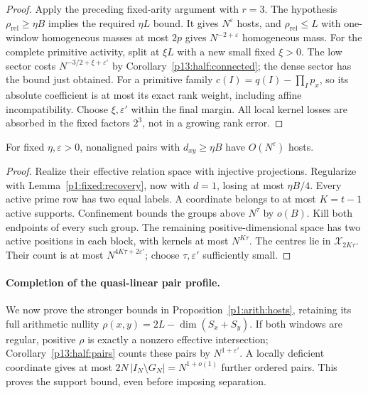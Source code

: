 \begin{proof}
Apply the preceding fixed-arity argument with $r=3$. The hypothesis
$\rho_{\mathrm{rel}}\ge\eta B$ implies the required $\eta L$ bound.
It gives $N^\varepsilon$ hosts, and $\rho_{\mathrm{rel}}\le L$ with
one-window homogeneous masses at most $2p$ gives
$N^{-2+\varepsilon}$ homogeneous mass.
For the complete primitive activity, split at $\xi L$ with a new
small fixed $\xi>0$. The low sector costs
$N^{-3/2+\xi+\varepsilon'}$ by
Corollary~\ref{p13:half:connected}; the dense sector has the bound
just obtained. For a primitive family $c(I)=q(I)-\prod_Ip_x$, so its
absolute coefficient is at most its exact rank weight, including
affine incompatibility. Choose $\xi,\varepsilon'$ within the final
margin. All local kernel losses are absorbed in the fixed factors
$2^3$, not in a growing rank error.
\end{proof}

\begin{corollary}
\label{p13:conf:dense-pairs}
For fixed \(\eta,\varepsilon>0\), nonaligned pairs
with \(d_{xy}\ge\eta B\) have \(O(N^\varepsilon)\)
hosts.
\end{corollary}

\begin{proof}
Realize their effective relation space with injective
projections. Regularize with
Lemma~\ref{p1:fixed:recovery}, now with \(d=1\),
losing at most \(\eta B/4\).
Every active prime row has two equal labels.
A coordinate belongs to at most \(K=t-1\) active supports.
Confinement bounds the groups above \(N^\tau\) by \(o(B)\).
Kill both endpoints of every such group.
The remaining positive-dimensional space has two active
positions in each block, with kernels at most \(N^{K\tau}\).
The centres lie in \(\mathcal X_{2K\tau}\).
Their count is at most \(N^{4K\tau+2\varepsilon'}\);
choose \(\tau,\varepsilon'\) sufficiently small.
\end{proof}


\paragraph{Completion of the quasi-linear pair profile.}
\label{p18:conf:pair-profile}
We now prove the stronger bounds in Proposition~\ref{p1:arith:hosts},
retaining its full arithmetic nullity
$\rho(x,y)=2L-\dim(S_x+S_y)$.
If both windows are regular, positive $\rho$ is exactly a nonzero
effective intersection; Corollary~\ref{p13:half:pairs} counts these
pairs by $N^{1+\varepsilon'}$. A locally deficient coordinate gives
at most $2N\,|I_N\setminus G_N|=N^{1+o(1)}$ further ordered pairs.
This proves the support bound, even before imposing separation.

